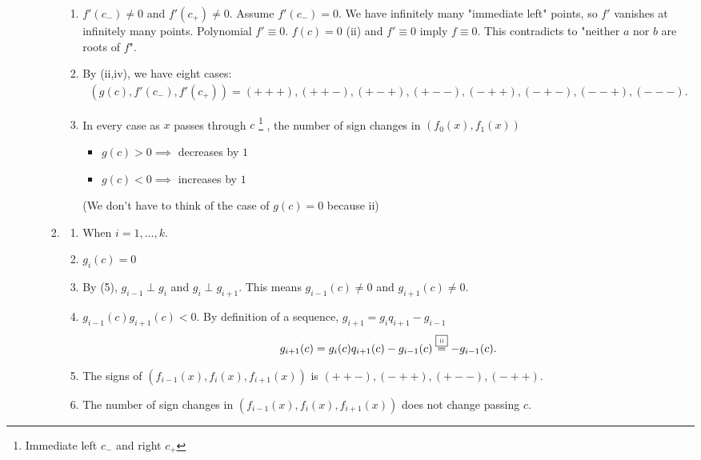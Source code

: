 \documentclass[9pt]{ltjsarticle}
\begin{document}
\begin{itemize}
\begin{enumerate}
\begin{enumerate}
\begin{enumerate}
          \item
          $f'(c_-) \neq 0$ and $f'(c_+) \neq 0$. \pf
          Assume $f'(c_-)=0$.  We have infinitely many "immediate left" points,
          so $f'$ vanishes at infinitely many points. Polynomial $f' \equiv 0$.
          $f(c)=0$ (ii) and $f'\equiv 0$ imply $f\equiv 0$.
          This contradicts to "neither $a$ nor $b$ are roots of $f$".
          \item
          By (ii,iv), we have eight cases:
          \begin{align}
            (g(c),f'(c_-),f'(c_+)) =
            (+++), (++-), (+-+), (+--), (-++), (-+-), (--+), (---).
          \end{align}
          \item
          In every case as $x$ passes through $c$
          \footnote{Immediate left $c_-$ and right $c_+$} ,
          the number of sign changes in $(f_0(x),f_1(x))$
          \begin{itemize}
            \item $g(c)>0 \implies$ decreases by $1$
            \item $g(c)<0 \implies$ increases by $1$
          \end{itemize}
          (We don't have to think of the case of $g(c)=0$ because ii)
        \end{enumerate}
        \item
        \begin{enumerate}
          \item When $i=1,\dots,k$.
          \item
          $g_i(c)=0$
          \item
          By (5), $g_{i-1}\perp g_i$ and $g_i \perp g_{i+1}$.
          This means $g_{i-1}(c)\neq 0$ and $g_{i+1}(c)\neq 0$.
          \item
          $g_{i-1}(c)g_{i+1}(c) < 0$. \pf
          By definition of a sequence, $g_{i+1}=g_i q_{i+1} - g_{i-1}$
          \begin{align}
            g_{i+1}(c) = g_i(c) q_{i+1}(c) - g_{i-1}(c) \overset{\text{\fbox{\tiny ii}}}{=} -g_{i-1}(c).
          \end{align}
          \item
          The signs of $(f_{i-1}(x),f_i(x),f_{i+1}(x))$ is
          $(++-),(-++),(+--),(-++)$.
          \item
          The number of sign changes in $(f_{i-1}(x),f_i(x),f_{i+1}(x))$ does not change
          passing $c$.
        \end{enumerate}

\end{enumerate}
\end{enumerate}
\end{itemize}
\end{document}
